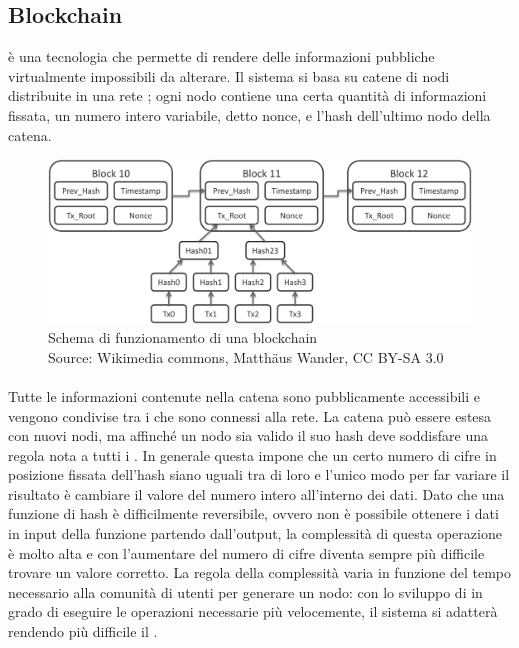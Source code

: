 	\subsection{Blockchain}
	 è una tecnologia che permette di rendere delle informazioni pubbliche virtualmente impossibili da alterare. Il sistema si basa su catene di nodi distribuite in una rete ; ogni nodo contiene una certa quantità di informazioni fissata, un numero intero variabile, detto nonce, e l'hash dell'ultimo nodo della catena.
	\begin{figure}[H]
		\begin{center}
			\includegraphics[width=16.5cm,keepaspectratio]{immagini/blockchain-data}
			\caption[Schema di funzionamento di una blockchain]{Schema di funzionamento di una blockchain
			\\
			Source: Wikimedia commons, Matthäus Wander, CC BY-SA 3.0}
		\end{center}
	\end{figure}
	\paragraph*{} Tutte le informazioni contenute nella catena sono pubblicamente accessibili e vengono condivise tra i  che sono connessi alla rete. La catena può essere estesa con nuovi nodi, ma affinché un nodo sia valido il suo hash deve soddisfare una regola nota a tutti i . In generale questa impone che un certo numero di cifre in posizione fissata dell'hash siano uguali tra di loro e l'unico modo per far variare il risultato è cambiare il valore del numero intero all'interno dei dati. Dato che una funzione di hash è difficilmente reversibile, ovvero non è possibile ottenere i dati in input della funzione partendo dall'output, la complessità di questa operazione è molto alta e con l'aumentare del numero di cifre diventa sempre più difficile trovare un valore corretto. La regola della complessità varia in funzione del tempo necessario alla comunità di utenti per generare un nodo: con lo sviluppo di  in grado di eseguire le operazioni necessarie più velocemente, il sistema si adatterà rendendo più difficile il .
